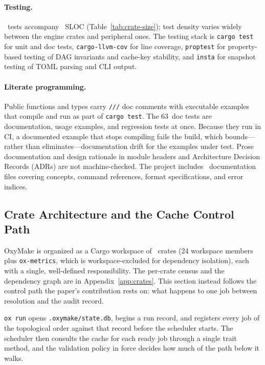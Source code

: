 \documentclass[12pt,a4paper]{article}
\newcommand{\code}[1]{{\texttt{\small\color{inlinecode}#1}}}
\newcommand{\metricDocTests}{63}           %
\begin{document}
\paragraph{Testing.}
\metricTests~tests accompany \metricSLOC~SLOC
(Table~\ref{tab:crate-size}); test density varies widely between the
engine crates and peripheral ones. The
testing stack is \code{cargo test} for unit and doc tests,
\code{cargo-llvm-cov} for line coverage, \code{proptest} for
property-based testing of DAG invariants and cache-key stability, and
\code{insta} for snapshot testing of TOML parsing and CLI output.

\paragraph{Literate programming.}
Public functions and types carry \code{///} doc comments with executable
examples that compile and run as part of \code{cargo test}. The
\metricDocTests~doc tests are documentation, usage examples, and
regression tests at once. Because they run in CI, a documented example
that stops compiling fails the build, which bounds---rather than
eliminates---documentation drift for the examples under test. Prose
documentation and design rationale in module headers and Architecture
Decision Records (ADRs) are not machine-checked. The project includes
\metricDocFiles~documentation files covering concepts, command
references, format specifications, and error indices.

\subsection{Crate Architecture and the Cache Control Path}
\label{sec:crates}

OxyMake is organized as a Cargo workspace of \metricCrates~crates (24
workspace members plus \code{ox-metrics}, which is workspace-excluded
for dependency isolation), each with a single, well-defined
responsibility. The per-crate census and the dependency graph are in
Appendix~\ref{app:crates}. This section instead follows the control path
the paper's contribution rests on: what happens to one job between
resolution and the audit record.

\code{ox run} opens \code{.oxymake/state.db}, begins a run record, and
registers every job of the topological order against that record before
the scheduler starts. The scheduler then consults the cache for each
ready job through a single trait method, and the validation policy in
force decides how much of the path below it walks.
\end{document}
